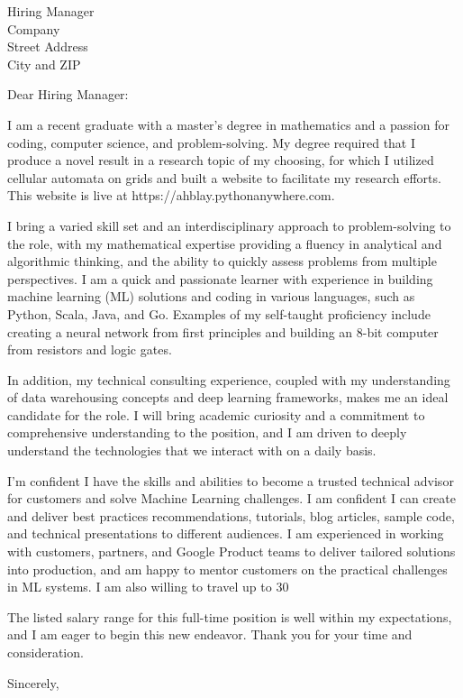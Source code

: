 \documentclass{letter}%
\begin{document}
%
\normalsize%
\begin{letter}{Hiring Manager \\ Company \\ Street Address \\ City and ZIP}%
\opening{Dear Hiring Manager:}%
I am a recent graduate with a master’s degree in mathematics and a passion for coding, computer science, and problem-solving. My degree required that I produce a novel result in a research topic of my choosing, for which I utilized cellular automata on grids and built a website to facilitate my research efforts. This website is live at https://ahblay.pythonanywhere.com. 

I bring a varied skill set and an interdisciplinary approach to problem-solving to the role, with my mathematical expertise providing a fluency in analytical and algorithmic thinking, and the ability to quickly assess problems from multiple perspectives. I am a quick and passionate learner with experience in building machine learning (ML) solutions and coding in various languages, such as Python, Scala, Java, and Go. Examples of my self-taught proficiency include creating a neural network from first principles and building an 8-bit computer from resistors and logic gates.

In addition, my technical consulting experience, coupled with my understanding of data warehousing concepts and deep learning frameworks, makes me an ideal candidate for the role. I will bring academic curiosity and a commitment to comprehensive understanding to the position, and I am driven to deeply understand the technologies that we interact with on a daily basis. 

I'm confident I have the skills and abilities to become a trusted technical advisor for customers and solve Machine Learning challenges. I am confident I can create and deliver best practices recommendations, tutorials, blog articles, sample code, and technical presentations to different audiences. I am experienced in working with customers, partners, and Google Product teams to deliver tailored solutions into production, and am happy to mentor customers on the practical challenges in ML systems. I am also willing to travel up to 30%

The listed salary range for this full-time position is well within my expectations, and I am eager to begin this new endeavor. Thank you for your time and consideration.%
\closing{Sincerely,}%
%
\end{letter}%
\end{document}
